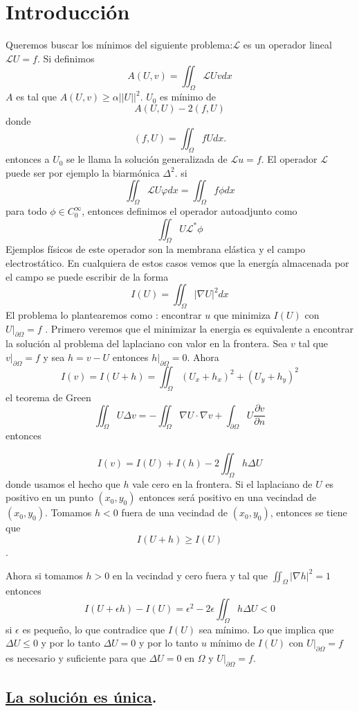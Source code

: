 \documentclass[a4paper,10pt]{book}
\begin{document}
\section{Introducci\'on}
Queremos buscar los m\'inimos del siguiente problema:$\mathscr{L}$ es un operador lineal
$\mathscr{L} U=f$.   Si definimos
\[A(U,v)=\iint_{\Omega} \mathscr{L} U v dx \] 
$A$ es tal que $A(U,v)\geq \alpha {|| U ||}^2$.  $U_0$ es m\'inimo de 
\[A(U,U)-2 (f,U) \]
donde 
\[(f,U)=\iint_{\Omega} f U dx.\]
entonces a $U_0$ se le llama la soluci\'on generalizada de $\mathscr{L} u=f$. El operador $\mathscr{L}$ puede ser 
por ejemplo la  biarm\'onica $\Delta^2$.
si
\[\iint_{\Omega} \mathscr{L} U\varphi dx =\iint_{\Omega} f \phi dx  \]
para todo $\phi \in C_0^\infty$, entonces definimos el operador autoadjunto como 
\[\iint_{\Omega} U \mathscr{L}^{*} \phi \]
Ejemplos f\'isicos de este operador son 
la membrana el\'astica y el campo electrost\'atico. En cualquiera de estos casos
vemos que la energ\'ia almacenada por el campo se puede escribir de la forma
\[I(U)=\iint_{\Omega} |\nabla U |^2 dx \]
El problema lo plantearemos como : encontrar $u$  que minimiza $I(U)$ con $U|_{\partial \Omega}=f$ .
Primero veremos que el minimizar la energia es equivalente a encontrar la soluci\'on al problema 
del laplaciano con valor en la frontera. Sea $v$ tal que $v|_{\partial \Omega}=f$ y sea
$h=v-U$ entonces $h|_{\partial \Omega}=0$. Ahora
\[I(v)= I(U+h)=  \iint_{\Omega} (U_x +h_x)^2+(U_y+h_y)^2  \]
el teorema de Green 
\[
\iint_\Omega U\Delta v = - \iint_\Omega \nabla U \cdot \nabla v + \int_{\partial \Omega} U \frac{\partial v}{\partial n}
\]
entonces

\[I(v)=I(U)+I(h)-2\iint_{\Omega} h \Delta U  \] 
donde usamos el hecho que $h$ vale cero en la frontera. Si el laplaciano de $U$ es positivo en un punto $(x_0,y_0)$
entonces ser\'a positivo en una vecindad de $(x_0,y_0)$.  Tomamos $h<0$ fuera de una vecindad de $(x_0,y_0)$, entonces se tiene que 
\[I(U+h)\geq I(U)\].

Ahora si tomamos
$h>0$ en la vecindad y cero fuera y tal que $\iint_{\Omega} |\nabla h|^2 =1$   entonces
\[I(U+\epsilon h)-I(U)= \epsilon^2-2\epsilon \iint_{\Omega} h \Delta U <0\]
si $ \epsilon$ es peque\~no, lo que contradice que $I(U)$ sea m\'inimo. Lo que implica que
$\Delta U\leq 0$ y por lo tanto $\Delta U=0$ y por lo tanto $u$ m\'inimo de $I(U)$  con $U|_{\partial \Omega} =f$ es necesario
y suficiente para que $\Delta U=0$ en $\Omega$ y $U|_{\partial \Omega}=f$.

\subsection*{\underline{La soluci\'on es \'unica}.}
\end{document}
